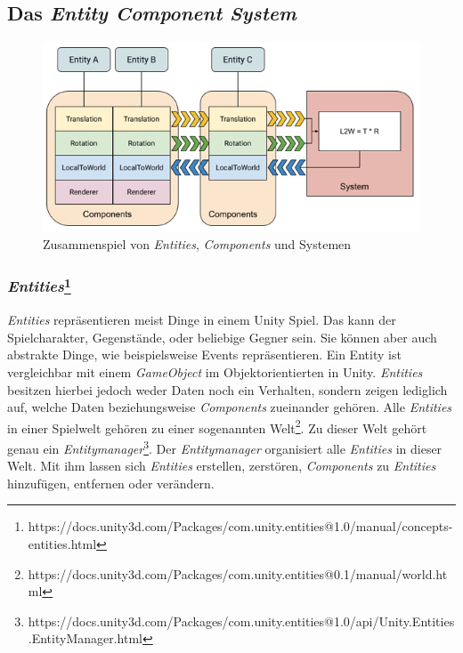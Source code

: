 \documentclass[12pt, titlepage]{article}
\DeclareRobustCommand{\#}{\adjustbox{valign=B,totalheight=.57\baselineskip}{\oldhash}}%
\begin{document}
\subsection{Das \textit{Entity Component System}} \label{ecs}
\begin{figure}[H]
\includegraphics[scale=0.87]{Bilder/ECSConcept.png}
\caption{Zusammenspiel von \textit{Entities}, \textit{Components} und Systemen}
\label{fig:ecs_concept}
\end{figure}
\subsubsection{\textit{Entities}\footnote{https://docs.unity3d.com/Packages/com.unity.entities@1.0/manual/concepts-entities.html}}\textit{Entities} repräsentieren meist Dinge in einem Unity Spiel. Das kann der Spielcharakter, Gegenstände, oder beliebige Gegner sein. Sie können aber auch abstrakte Dinge, wie beispielsweise Events repräsentieren. Ein Entity ist vergleichbar mit einem \textit{GameObject} im Objektorientierten in Unity. \textit{Entities} besitzen hierbei jedoch weder Daten noch ein Verhalten, sondern zeigen lediglich auf, welche Daten beziehungsweise \textit{Components} zueinander gehören. Alle \textit{Entities} in einer Spielwelt gehören zu einer sogenannten Welt\footnote{https://docs.unity3d.com/Packages/com.unity.entities@0.1/manual/world.html}. Zu dieser Welt gehört genau ein \textit{Entitymanager}\footnote{https://docs.unity3d.com/Packages/com.unity.entities@1.0/api/Unity.Entities.EntityManager.html}. Der \textit{Entitymanager} organisiert alle \textit{Entities} in dieser Welt. Mit ihm lassen sich \textit{Entities} erstellen, zerstören, \textit{Components} zu \textit{Entities} hinzufügen, entfernen oder verändern.
\end{document}
